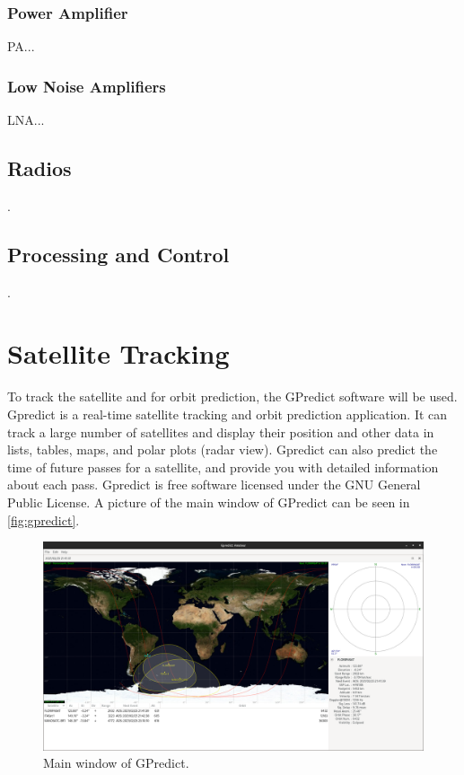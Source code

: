 \subsubsection{Power Amplifier}

PA...

\subsubsection{Low Noise Amplifiers}

LNA...

\subsection{Radios}

.

\subsection{Processing and Control}

.

\section{Satellite Tracking}

To track the satellite and for orbit prediction, the GPredict software \cite{gpredict} will be used. Gpredict is a real-time satellite tracking and orbit prediction application. It can track a large number of satellites and display their position and other data in lists, tables, maps, and polar plots (radar view). Gpredict can also predict the time of future passes for a satellite, and provide you with detailed information about each pass. Gpredict is free software licensed under the GNU General Public License. A picture of the main window of GPredict can be seen in \autoref{fig:gpredict}.

\begin{figure}[!ht]
    \begin{center}
        \includegraphics[width=\textwidth]{figures/gpredict.png}
        \caption{Main window of GPredict.}
        \label{fig:gpredict}
    \end{center}
\end{figure}

